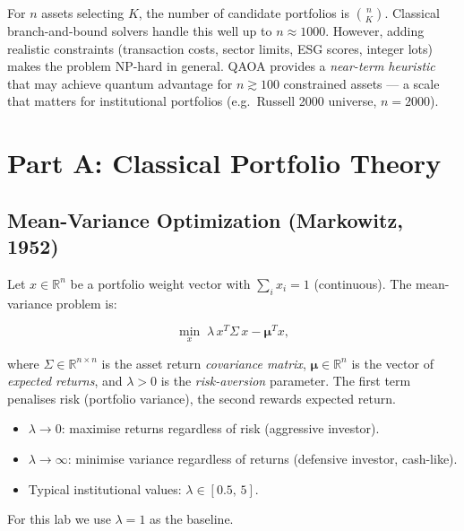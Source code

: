 \documentclass[a4paper,11pt]{article}
\begin{document}
\begin{warningbox}
For $n$ assets selecting $K$, the number of candidate portfolios is
$\binom{n}{K}$. Classical branch-and-bound solvers handle this well up
to $n \approx 1000$. However, adding realistic constraints (transaction
costs, sector limits, ESG scores, integer lots) makes the problem
NP-hard in general. QAOA provides a \emph{near-term heuristic} that
may achieve quantum advantage for $n \gtrsim 100$ constrained assets —
a scale that matters for institutional portfolios (e.g.\ Russell 2000
universe, $n=2000$).
\end{warningbox}

\section{Part A: Classical Portfolio Theory}

\subsection{Mean-Variance Optimization (Markowitz, 1952)}

Let $x \in \mathbb{R}^n$ be a portfolio weight vector with
$\sum_i x_i = 1$ (continuous). The mean-variance problem is:

\begin{equation}
    \min_x\; \lambda\, x^T \Sigma\, x - \boldsymbol\mu^T x,
    \label{eq:mv-cont}
\end{equation}

where $\Sigma \in \mathbb{R}^{n\times n}$ is the asset return
\emph{covariance matrix}, $\boldsymbol\mu \in \mathbb{R}^n$ is the
vector of \emph{expected returns}, and $\lambda > 0$ is the
\emph{risk-aversion} parameter. The first term penalises risk (portfolio
variance), the second rewards expected return.

\begin{defbox}
\begin{itemize}
    \item $\lambda \to 0$: maximise returns regardless of risk
          (aggressive investor).
    \item $\lambda \to \infty$: minimise variance regardless of returns
          (defensive investor, cash-like).
    \item Typical institutional values: $\lambda \in [0.5,\, 5]$.
\end{itemize}
For this lab we use $\lambda = 1$ as the baseline.
\end{defbox}
\end{document}
